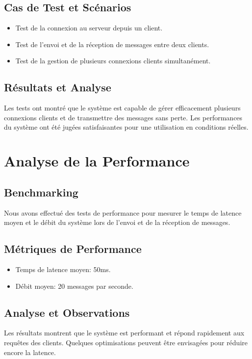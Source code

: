 \documentclass{article}
\begin{document}
\subsection{Cas de Test et Scénarios}
\begin{itemize}
    \item Test de la connexion au serveur depuis un client.
    \item Test de l'envoi et de la réception de messages entre deux clients.
    \item Test de la gestion de plusieurs connexions clients simultanément.
\end{itemize}

\subsection{Résultats et Analyse}
Les tests ont montré que le système est capable de gérer efficacement plusieurs connexions clients et de transmettre des messages sans perte. Les performances du système ont été jugées satisfaisantes pour une utilisation en conditions réelles.

\section{Analyse de la Performance}
\subsection{Benchmarking}
Nous avons effectué des tests de performance pour mesurer le temps de latence moyen et le débit du système lors de l'envoi et de la réception de messages.

\subsection{Métriques de Performance}
\begin{itemize}
    \item Temps de latence moyen: 50ms.
    \item Débit moyen: 20 messages par seconde.
\end{itemize}

\subsection{Analyse et Observations}
Les résultats montrent que le système est performant et répond rapidement aux requêtes des clients. Quelques optimisations peuvent être envisagées pour réduire encore la latence.
\end{document}

